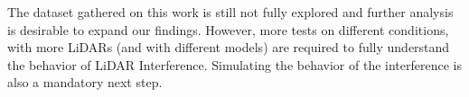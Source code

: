 The dataset gathered on this work is still not fully explored and further analysis is desirable to expand our findings. However, more tests on different conditions, with more LiDARs (and with different  models) are required to fully understand the behavior of LiDAR Interference. Simulating the behavior of the interference is also a mandatory next step.



